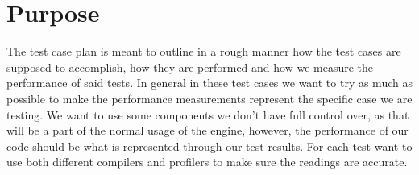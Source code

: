 \section{Purpose}

\noindent The test case plan is meant to outline in a rough manner how the test cases are supposed to accomplish, how they are performed and how we measure the performance of said tests.
In general in these test cases we want to try as much as possible to make the performance measurements represent the specific case we are testing.
We want to use some components we don't have full control over, as that will be a part of the normal usage of the engine, however, the performance of our code should be what is represented through our test results. 
For each test want to use both different compilers and profilers to make sure the readings are accurate. 
